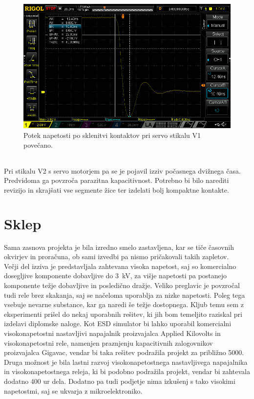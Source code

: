 \documentclass[a4paper,twoside,openright,12pt,Slovene]{book}
\begin{document}
    \begin{figure}[H]
        \centering
        \includegraphics[width=1\columnwidth]{Slike/ServoStikalo1/ServoStikalo1povecano.png}
        \caption{\label{ServoStikalo1povecano} Potek napetosti po sklenitvi kontaktov pri servo stikalu V1 povečano.}
    \end{figure}
    
    ~\\Pri stikalu V2 s servo motorjem pa se je pojavil izziv počasnega dvižnega časa. Predvidoma ga povzroča parazitna kapacitivnost. Potrebno bi bilo narediti revizijo in skrajšati vse segmente žice ter izdelati bolj kompaktne kontakte.
    





\chapter{Sklep} \label{Sklep}

Sama zasnova projekta je bila izredno smelo zastavljena, kar se tiče časovnih okvirjev in proračuna, ob sami izvedbi pa nismo pričakovali takih zapletov.
~\\Večji del izziva je predstavljala zahtevana visoka napetost, saj so komercialno
dosegljive komponente dobavljive do \SI{3}{\kilo\volt}, za višje napetosti pa postanejo komponente težje dobavljive in posledično dražje. Veliko preglavic je povzročal tudi rele brez skakanja, saj se načeloma uporablja za nizke napetosti. Poleg tega vsebuje nevarne substance, kar ga naredi še težje dostopnega. Kljub temu sem z eksperimenti prišel do nekaj uporabnih rešitev, ki jih bom temeljito raziskal pri izdelavi diplomske naloge. Kot ESD simulator bi lahko uporabil komercialni visokonapetostni nastavljivi napajalnik proizvajalca Applied Kilovolts in visokonapetostni rele, namenjen praznjenju kapacitivnih zalogovnikov
proizvajalca Gigavac, vendar bi taka rešitev podražila projekt za približno 5000\texteuro . Druga možnost je bila lastni razvoj visokonapetostnega nastavljivega
napajalnika in visokonapetostnega releja, ki bi podobno podražila projekt, vendar bi zahtevala dodatno 400 ur dela. Dodatno pa tudi podjetje nima izkušenj s tako visokimi napetostmi, saj se ukvarja z mikroelektroniko.


	
 
\end{document}
